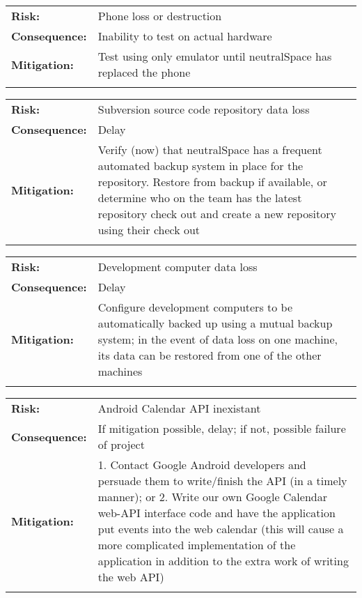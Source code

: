 \documentclass[11pt]{article}
\begin{document}
		\begin{tabular}{lp{118mm}}\\
		{\bf Risk:}        & Phone loss or destruction\\
		{\bf Consequence:} & Inability to test on actual hardware\\
		{\bf Mitigation:}  & Test using only emulator until neutralSpace has replaced the phone\\\\
		\end{tabular}

		\begin{tabular}{lp{118mm}}\\
		{\bf Risk:}        & Subversion source code repository data loss\\
		{\bf Consequence:} & Delay\\
		{\bf Mitigation:}  & Verify (now) that neutralSpace has a frequent automated backup system in place for the repository. Restore from backup if available, or determine who on the team has the latest repository check out and create a new repository using their check out\\\\
		\end{tabular}

		\begin{tabular}{lp{118mm}}\\
		{\bf Risk:}        & Development computer data loss\\
		{\bf Consequence:} & Delay\\
		{\bf Mitigation:}  & Configure development computers to be automatically backed up using a mutual backup system; in the event of data loss on one machine, its data can be restored from one of the other machines\\\\
		\end{tabular}

		\begin{tabular}{lp{118mm}}\\
		{\bf Risk:}        & Android Calendar API inexistant\\
		{\bf Consequence:} & If mitigation possible, delay; if not, possible failure of project\\
		{\bf Mitigation:}  & 1. Contact Google Android developers and persuade them to write/finish the API (in a timely manner); or 2. Write our own Google Calendar web-API interface code and have the application put events into the web calendar (this will cause a more complicated implementation of the application in addition to the extra work of writing the web API)\\\\
		\end{tabular}
\end{document}
